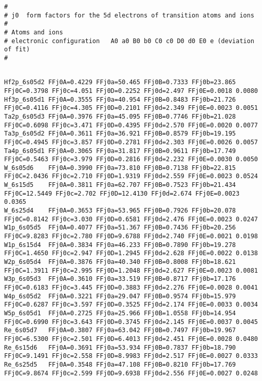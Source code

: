 {\scriptsize
\begin{verbatim}
#
# j0  form factors for the 5d electrons of transition atoms and ions  
#
# Atoms and ions
# electronic configuration   A0 a0 B0 b0 C0 c0 D0 d0 E0 e (deviation of fit)
#
\end{verbatim}
\begin{verbatim}

Hf2p_6s05d2 FFj0A=0.4229 FFj0a=50.465 FFj0B=0.7333 FFj0b=23.865 FFj0C=0.3798 FFj0c=4.051 FFj0D=0.2252 FFj0d=2.497 FFj0E=0.0018 0.0080
Hf3p_6s05d1 FFj0A=0.3555 FFj0a=40.954 FFj0B=0.8483 FFj0b=21.726 FFj0C=0.4116 FFj0c=4.305 FFj0D=0.2101 FFj0d=2.349 FFj0E=0.0023 0.0051
Ta2p_6s05d3 FFj0A=0.3976 FFj0a=45.095 FFj0B=0.7746 FFj0b=21.028 FFj0C=0.6098 FFj0c=3.471 FFj0D=0.4395 FFj0d=2.570 FFj0E=0.0020 0.0077
Ta3p_6s05d2 FFj0A=0.3611 FFj0a=36.921 FFj0B=0.8579 FFj0b=19.195 FFj0C=0.4945 FFj0c=3.857 FFj0D=0.2781 FFj0d=2.303 FFj0E=0.0026 0.0057
Ta4p_6s05d1 FFj0A=0.3065 FFj0a=31.817 FFj0B=0.9611 FFj0b=17.749 FFj0C=0.5463 FFj0c=3.979 FFj0D=0.2816 FFj0d=2.232 FFj0E=0.0030 0.0050
W_6s05d6    FFj0A=0.3990 FFj0a=73.810 FFj0B=0.7138 FFj0b=22.815 FFj0C=2.0436 FFj0c=2.710 FFj0D=1.9319 FFj0d=2.559 FFj0E=0.0023 0.0524
W_6s15d5    FFj0A=0.3811 FFj0a=62.707 FFj0B=0.7523 FFj0b=21.434 FFj0C=12.5449 FFj0c=2.702 FFj0D=12.4130 FFj0d=2.674 FFj0E=0.0023 0.0365
W_6s25d4    FFj0A=0.3653 FFj0a=53.965 FFj0B=0.7926 FFj0b=20.078 FFj0C=0.8142 FFj0c=3.030 FFj0D=0.6581 FFj0d=2.476 FFj0E=0.0023 0.0247
W1p_6s05d5  FFj0A=0.4077 FFj0a=51.367 FFj0B=0.7436 FFj0b=20.256 FFj0C=9.8283 FFj0c=2.780 FFj0D=9.6788 FFj0d=2.740 FFj0E=0.0021 0.0198
W1p_6s15d4  FFj0A=0.3834 FFj0a=46.233 FFj0B=0.7890 FFj0b=19.278 FFj0C=1.4650 FFj0c=2.947 FFj0D=1.2945 FFj0d=2.628 FFj0E=0.0022 0.0138
W2p_6s05d4  FFj0A=0.3876 FFj0a=40.340 FFj0B=0.8008 FFj0b=18.621 FFj0C=1.3911 FFj0c=2.995 FFj0D=1.2048 FFj0d=2.627 FFj0E=0.0023 0.0081
W3p_6s05d3  FFj0A=0.3610 FFj0a=33.519 FFj0B=0.8717 FFj0b=17.176 FFj0C=0.6183 FFj0c=3.445 FFj0D=0.3883 FFj0d=2.276 FFj0E=0.0028 0.0041
W4p_6s05d2  FFj0A=0.3221 FFj0a=29.047 FFj0B=0.9574 FFj0b=15.979 FFj0C=0.6287 FFj0c=3.597 FFj0D=0.3525 FFj0d=2.174 FFj0E=0.0033 0.0034
W5p_6s05d1  FFj0A=0.2725 FFj0a=25.966 FFj0B=1.0558 FFj0b=14.954 FFj0C=0.6990 FFj0c=3.643 FFj0D=0.3745 FFj0d=2.145 FFj0E=0.0037 0.0045
Re_6s05d7   FFj0A=0.3807 FFj0a=63.042 FFj0B=0.7497 FFj0b=19.967 FFj0C=6.5300 FFj0c=2.501 FFj0D=6.4013 FFj0d=2.451 FFj0E=0.0028 0.0480
Re_6s15d6   FFj0A=0.3691 FFj0a=53.934 FFj0B=0.7837 FFj0b=18.790 FFj0C=9.1491 FFj0c=2.558 FFj0D=8.9983 FFj0d=2.517 FFj0E=0.0027 0.0333
Re_6s25d5   FFj0A=0.3548 FFj0a=47.108 FFj0B=0.8210 FFj0b=17.769 FFj0C=9.8674 FFj0c=2.599 FFj0D=9.6938 FFj0d=2.556 FFj0E=0.0027 0.0248

\end{verbatim}}
